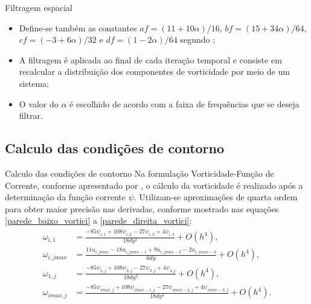\begin{frame}{Filtragem espacial}
\begin{itemize}
    \item Define-se também as constantes $af=(11+10\alpha)/16$, $bf=(15+34\alpha)/64$, $cf=(-3+6\alpha)/32$ e $df=(1-2\alpha)/64$ segundo \cite{lele1992compact};
    \item A filtragem é aplicada ao final de cada iteração temporal e consiste em recalcular a distribuição dos componentes de vorticidade por meio de um sistema; 
    \item O valor do $\alpha$ é escolhido de acordo com a faixa de frequências que se deseja filtrar.
\end{itemize}
\end{frame}

\subsection{Calculo das condições de contorno}

\begin{frame}{Calculo das condições de contorno}
Na formulação Vorticidade-Função de Corrente, conforme apresentado por \cite{roache1972computational}, o cálculo da vorticidade é realizado após a determinação da função corrente $ \psi $. Utilizam-se aproximações de quarta ordem para obter maior precisão nas derivadas, conforme mostrado nas equações \eqref{parede_baixo_vortici} a \eqref{parede_direita_vortici}:
\begin{align}
    \omega_{i,1} &= \frac{-85\psi_{i,1} + 108\psi_{i,2} - 27\psi_{i,3} + 4\psi_{i,4}}{18dy^{2}} + O(h^{4}), \label{parede_baixo_vortici} \\
    \omega_{i,jmax} &= \frac{11u_{i,jmax} - 18u_{i,jmax-1} + 9u_{i,jmax-2} - 2u_{i,jmax-3}}{6dy} + O(h^{4}), \label{parede_cima_vortici}\\
    \omega_{1,j} &= \frac{-85\psi_{1,j} + 108\psi_{2,j} - 27\psi_{3,j} + 4\psi_{4,j}}{18dy^{2}} + O(h^{4}), \label{parede_esquerda_vortici}\\
    \omega_{imax,j} &= \frac{-85\psi_{imax,j} + 108\psi_{imax-1,j} - 27\psi_{imax-2,j} + 4\psi_{imax-3,j}}{18dy^{2}} + O(h^{4}). \label{parede_direita_vortici}
\end{align}
\end{frame}